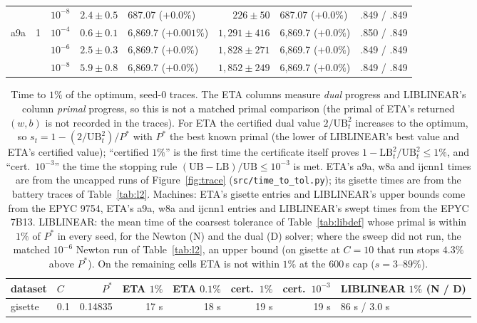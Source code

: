 \documentclass[pdflatex,sn-apa]{sn-jnl}%
\theoremstyle{thmstyleone}
\theoremstyle{thmstyletwo}
\newcommand{\UB}{\mathrm{UB}}
\newcommand{\LB}{\mathrm{LB}}
\begin{document}
\begin{table}
\begin{tabular}{lrrrlrlc}
 & & $10^{-8}$ & $2.4\pm0.5$ & 687.07 ($+0.0\%$) & $226\pm50$ & 687.07 ($+0.0\%$) & .849 / .849 \\
a9a & 1 & $10^{-4}$ & $0.6\pm0.1$ & 6{,}869.7 ($+0.001\%$) & $1{,}291\pm416$ & 6{,}869.7 ($+0.0\%$) & .850 / .849 \\
 & & $10^{-6}$ & $2.5\pm0.3$ & 6{,}869.7 ($+0.0\%$) & $1{,}828\pm271$ & 6{,}869.7 ($+0.0\%$) & .849 / .849 \\
 & & $10^{-8}$ & $5.9\pm0.8$ & 6{,}869.7 ($+0.0\%$) & $1{,}852\pm249$ & 6{,}869.7 ($+0.0\%$) & .849 / .849 \\
\bottomrule
\end{tabular}\end{table}

\begin{table}[htbp]\centering\scriptsize
\caption{Time to $1\%$ of the optimum, seed-0 traces. The ETA columns
measure \emph{dual} progress and LIBLINEAR's column \emph{primal}
progress, so this is not a matched primal comparison (the primal of
ETA's returned $(w,b)$ is not recorded in the traces). For ETA the
certified dual value $2/\UB_t^2$ increases to the optimum,
so $s_t=1-(2/\UB_t^2)/P^*$ with $P^*$ the best known primal (the lower
of LIBLINEAR's best value and ETA's certified value); ``certified
$1\%$'' is the first time the certificate itself proves
$1-\LB_t^2/\UB_t^2\le1\%$, and ``cert.\ $10^{-3}$'' the time the stopping
rule $(\UB-\LB)/\UB\le10^{-3}$ is met. ETA's a9a, w8a and ijcnn1 times are from
the uncapped runs of Figure~\ref{fig:trace} (\texttt{src/time\_to\_tol.py});
its gisette times are from the battery traces of Table~\ref{tab:l2}.
Machines: ETA's gisette entries and LIBLINEAR's upper bounds come from
the EPYC 9754, ETA's a9a, w8a and ijcnn1 entries and LIBLINEAR's swept
times from the EPYC 7B13.
LIBLINEAR: the mean time of the coarsest tolerance of Table~\ref{tab:libdef} whose primal is within
$1\%$ of $P^*$ in every seed, for the Newton (N) and the dual (D)
solver; where the sweep did not run, the matched $10^{-6}$
Newton run of Table~\ref{tab:l2}, an upper bound (on gisette at
$C{=}10$ that run stops $4.3\%$ above $P^*$). On the remaining cells
ETA is not within $1\%$ at the 600\,s cap ($s=3$--$89\%$).}\label{tab:t1}
\setlength{\tabcolsep}{2pt}
\begin{tabular}{llrrrrrl}\toprule
dataset & $C$ & $P^*$ & ETA $1\%$ & ETA $0.1\%$ & cert.\ $1\%$ & cert.\ $10^{-3}$ & LIBLINEAR $1\%$ (N / D) \\\midrule
gisette & 0.1 & 0.14835 & 17 s & 18 s & 19 s & 19 s & 86 s / 3.0 s \\

\end{tabular}
\end{table}
\end{document}
